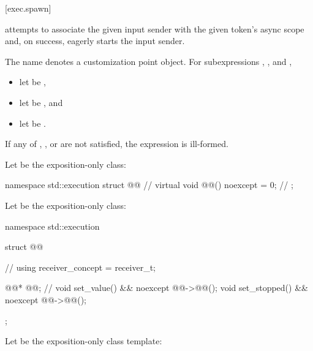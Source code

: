 [exec.spawn]{}

\pnum
{} attempts to associate the given input sender with
the given token's async scope and, on success,
eagerly starts the input sender.

\pnum
The name  denotes a customization point object.
For subexpressions , , and ,
\begin{itemize}
\item let  be ,
\item let  be , and
\item let  be .
\end{itemize}
If any of
,
, or
are not satisfied,
the expression  is ill-formed.

\pnum
Let  be the exposition-only class:

%
\begin{codeblock}
namespace std::execution {
  struct @@ {                                 // \expos
    virtual void @@() noexcept = 0;                   // \expos
  };
}
\end{codeblock}

\pnum
Let  be the exposition-only class:

%
\begin{codeblock}
namespace std::execution {
  struct @@ {                                   // \expos
    using receiver_concept = receiver_t;

    @@* @@;                                // \expos
    void set_value() && noexcept { @@->@@(); }
    void set_stopped() && noexcept { @@->@@(); }
  };
}
\end{codeblock}

\pnum
Let  be the exposition-only class template:


